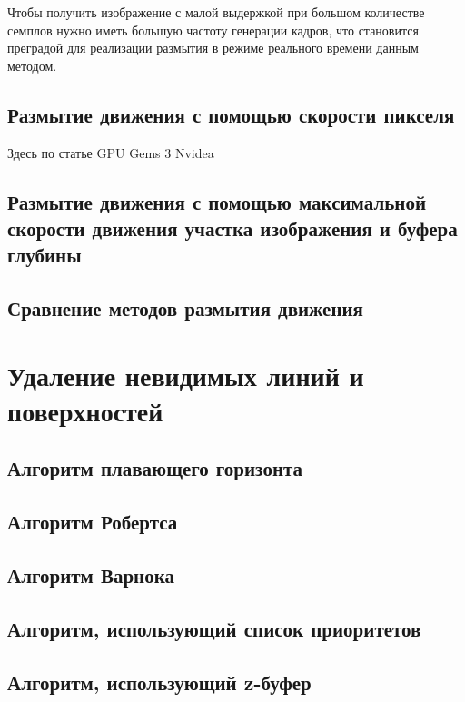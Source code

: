 Чтобы получить изображение с малой выдержкой при большом количестве семплов нужно иметь большую частоту генерации кадров, что становится преградой для реализации размытия в режиме реального времени данным методом.

\subsection{Размытие движения с помощью скорости пикселя}

Здесь по статье GPU Gems 3 Nvidea

\subsection{Размытие движения с помощью максимальной скорости движения участка изображения и буфера глубины}

\subsection{Сравнение методов размытия движения}




\section{Удаление невидимых линий и поверхностей}

\subsection{Алгоритм плавающего горизонта}

\subsection{Алгоритм Робертса}

\subsection{Алгоритм Варнока}

\subsection{Алгоритм, использующий список приоритетов}

\subsection{Алгоритм, использующий z-буфер}

